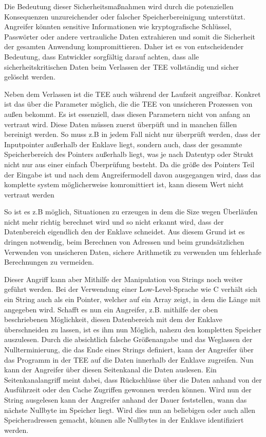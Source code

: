 Die Bedeutung dieser Sicherheitsmaßnahmen wird durch die potenziellen Konsequenzen unzureichender oder falscher Speicherbereinigung unterstützt. Angreifer könnten sensitive Informationen wie kryptografische Schlüssel, Passwörter oder andere vertrauliche Daten extrahieren und somit die Sicherheit der gesamten Anwendung kompromittieren. Daher ist es von entscheidender Bedeutung, dass Entwickler sorgfältig darauf achten, dass alle sicherheitskritischen Daten beim Verlassen der TEE vollständig und sicher gelöscht werden.

Neben dem Verlassen ist die TEE auch während der Laufzeit angreifbar. Konkret ist das über die Parameter möglich, die die TEE von unsicheren Prozessen von außen bekommt. Es ist essenziell, dass diesen Parametern nicht von anfang an vertraut wird. Diese Daten müssen zuerst überpüft und in manchen fällen bereinigt werden. So muss z.B in jedem Fall nicht nur überprüft werden, dass der Inputpointer außerhalb der Enklave liegt, sondern auch, dass der gesammte Speicherbereich des Pointers außerhalb liegt, was je nach Datentyp oder Strukt nicht nur aus einer einfach Überprüfung besteht. Da die größe des Pointers Teil der Eingabe ist und nach dem Angreifermodell davon ausgegangen wird, dass das komplette system möglicherweise komromittiert ist, kann diesem Wert nicht vertraut werden

So ist es z.B möglich, Situationen zu erzeugen in dem die Size wegen Überläufen nicht mehr richtig berechnet wird und so nicht erkannt wird, dass der Datenbereich eigendlich den der Enklave schneidet. Aus diesem Grund ist es dringen notwendig, beim Berechnen von Adressen und beim grundsätzlichen Verwenden von unsicheren Daten, sichere Arithmetik zu verwenden um fehlerhafe Berechnungen zu vermeiden.

Dieser Angriff kann aber Mithilfe der Manipulation von Strings noch weiter geführt werden. Bei der Verwendung einer Low-Level-Sprache wie C verhält sich ein String auch als ein Pointer, welcher auf ein Array zeigt, in dem die Länge mit angegeben wird. Schafft es nun ein Angreifer, z.B. mithilfe der oben beschriebenen Möglichkeit, diesen Datenbereich mit dem der Enklave überschneiden zu lassen, ist es ihm nun Möglich, nahezu den kompletten Speicher auszulesen. Durch die absichtlich falsche Größenangabe und das Weglassen der Nullterminierung, die das Ende eines Strings definiert, kann der Angreifer über das Programm in der TEE auf die Daten innerhalb der Enklave zugreifen. Nun kann der Angreifer über diesen Seitenkanal die Daten auslesen. Ein Seitenkanalangriff meint dabei, dass Rückschlüsse über die Daten anhand von der Ausführzeit oder den Cache Zugriffen gewonnen werden können. \cite{TEEPaper} Wird nun der String ausgelesen kann der Angreifer anhand der Dauer feststellen, wann das nächste Nullbyte im Speicher liegt. Wird dies nun an beliebigen oder auch allen Speicheradressen gemacht, können alle Nullbytes in der Enklave identifiziert werden. 

